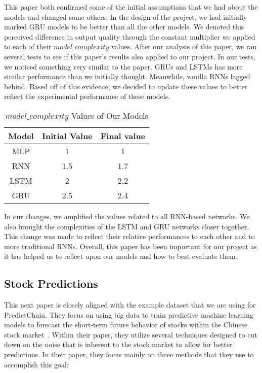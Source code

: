 \documentclass{article}
\begin{document}
    This paper both confirmed some of the initial assumptions that we had about the models and changed some others.
    In the design of the project, we had initially marked GRU models to be better than all the other models.
    We denoted this perceived difference in output quality through the constant multiplier we applied to each of their
    $model\_complexity$ values.  After our analysis of this paper, we ran several tests to see if this paper's results
    also applied to our project.  In our tests, we noticed something very similar to the paper.  GRUs and LSTMs
    has more similar performance than we initially thought.  Meanwhile, vanilla RNNs lagged behind.  Based off of
    this evidence, we decided to update these values to better reflect the experimental performance of these models.

    \begin{table}[H]
        \begin{center}
            \caption{$model\_complexity$ Values of Our Models}
            \label{tab:modelComplexity}
            \begin{tabular}{c|c|c}
                \textbf{Model} & \textbf{Initial Value} & \textbf{Final value}\\
                \hline
                MLP & 1 & 1\\
                RNN & 1.5 & 1.7\\
                LSTM & 2 & 2.2\\
                GRU & 2.5 & 2.4
            \end{tabular}
        \end{center}
    \end{table}

    In our changes, we amplified the values related to all RNN-based networks.  We also brought the complexities
    of the LSTM and GRU networks closer together.  This change was made to reflect their relative performances to
    each other and to more traditional RNNs.  Overall, this paper has been important for our project as it has
    helped us to reflect upon our models and how to best evaluate them.

    \subsection{Stock Predictions}

    This next paper is closely aligned with the example dataset that we are using for PredictChain.  They focus on
    using big data to train predictive machine learning models to forecast the short-term future behavior of stocks
    within the Chinese stock market~\cite{deepPrediction}.  Within their paper, they utilize several techniques designed
    to cut down on the noise that is inherent to the stock market to allow for better predictions.  In their paper,
    they focus mainly on three methods that they use to accomplish this goal:
\end{document}

